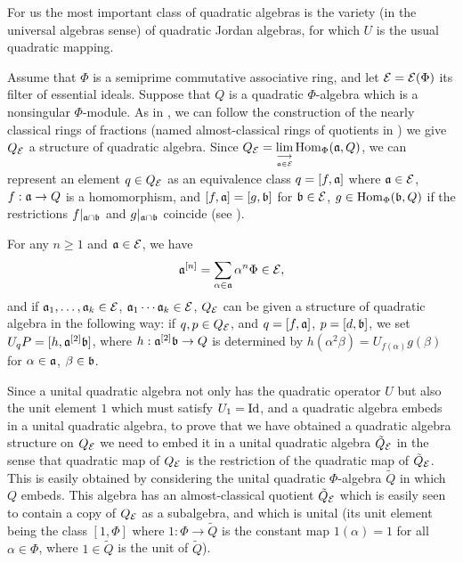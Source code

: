 \documentclass[a4paper,twoside,11pt]{article}
\theoremstyle{plain}
\theoremstyle{miestilo}
\theoremstyle{misnotas}
\begin{document}
For us the most important class of quadratic algebras is the variety (in the universal algebras sense) of quadratic Jordan algebras,
for which $U$ is the usual quadratic mapping.

Assume that $\Phi$ is a semiprime commutative associative ring, and let ${\cal E}={\cal E} (\Phi)$ its filter of essential
ideals. Suppose that $Q$ is a quadratic $\Phi$-algebra which is a nonsingular $\Phi$-module. As in \cite{densos},
we can follow the construction of the nearly classical rings of fractions \cite{bmi} (named almost-classical rings of quotients
in \cite{wis,densos}) we give $Q_{\cal E}$ a structure of quadratic algebra. Since $ Q_{\cal E}=\displaystyle \lim_{\underset{\frak a \in \cal E}\longrightarrow} {\rm Hom}_{\Phi}(\frak a, Q)$, we can represent an element $q \in Q_{\cal E}$ as an equivalence class $q=[f,\frak a]$ where $\frak a \in \cal E$, $f: \frak a \rightarrow Q$ is a homomorphism, and $[f,\frak a]=[g,\frak b]$ for $\frak b \in \cal E$, $g \in {\rm Hom} _{\Phi}(\frak b, Q)$ if the restrictions $f \vert_{\frak a \cap \frak b}$ and $g \vert_{\frak a \cap \frak b}$ coincide (see \cite{st}).

For any $n\ge 1$ and $\frak a \in \cal E$, we have $$\frak a^{[n]}=\sum _{\alpha \in \frak a} \alpha^{n}\Phi \in \cal E,$$
and if $\frak {a}_1,\dots,\frak {a}_k \in \cal E$, $\frak {a}_1\cdots\frak {a}_k \in \cal E$, $Q_{\cal E}$ can be given a structure
of quadratic algebra in the following way: if $q,p \in Q_{\cal E}$, and $q=[f,\frak a]$, $p=[d,\frak b]$, we set $U_{q}P=[h,\frak {a}^{[2]} \frak b]$,
where $h:\frak {a}^{[2]} \frak b \rightarrow Q$ is determined by $h(\alpha ^{2} \beta)=U_{f(\alpha)}g(\beta)$ for $\alpha \in \frak a$,
$\beta \in \frak b$.

Since a unital quadratic algebra not only has the quadratic operator $U$ but also the unit element $1$ which must satisfy $U_1=\rm Id$, and
a quadratic algebra embeds in a unital quadratic algebra, to prove that we have obtained a quadratic algebra structure on $Q_{\cal E}$
we need to embed it in a unital quadratic algebra $\tilde{Q}_{\cal E}$ in the sense that quadratic  map of $Q_{\cal E}$ is the restriction
of the quadratic map of $\tilde{Q}_{\cal E}$. This is easily obtained by considering the unital quadratic $\Phi$-algebra $\tilde{Q}$ in which $Q$ embeds. This algebra has an almost-classical quotient $\tilde{Q}_{\cal E}$ which is easily seen to contain a copy of $Q_{\cal E}$ as a subalgebra, and which is unital (its unit element being the class $[1,\Phi]$ where $1:\Phi \rightarrow \tilde {Q}$ is the constant map $1(\alpha)=1$
for all $\alpha \in \Phi$, where $1 \in \tilde{Q}$ is the unit of $\tilde{Q}$).
\end{document}
